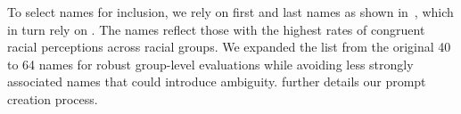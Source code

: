 

To select names for inclusion, we rely on first and last names as shown in~\textcite{haim2024whatsnameauditinglarge}, which in turn rely on \textcite{gaddis2017black}. The names reflect those with the highest rates of congruent racial perceptions across racial groups. We expanded the list from the original 40 to 64 names for robust group-level evaluations while avoiding less strongly associated names that could introduce ambiguity.  further details our prompt creation process.



 
    

